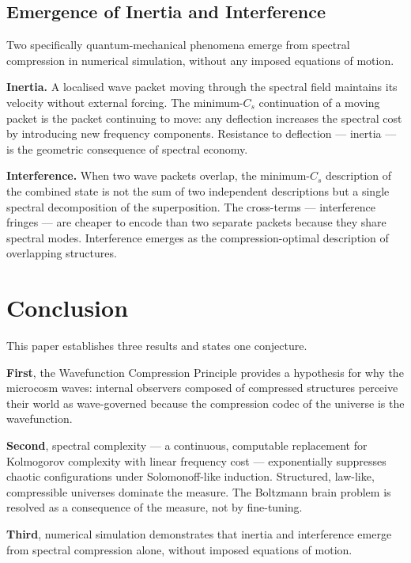 \documentclass[11pt]{article}
\begin{document}
\subsection{Emergence of Inertia and Interference}

Two specifically quantum-mechanical phenomena emerge from spectral
compression in numerical simulation, without any imposed equations of
motion.

\textbf{Inertia.} A localised wave packet moving through the spectral
field maintains its velocity without external forcing. The minimum-$C_s$
continuation of a moving packet is the packet continuing to move: any
deflection increases the spectral cost by introducing new frequency
components. Resistance to deflection --- inertia --- is the geometric
consequence of spectral economy.

\textbf{Interference.} When two wave packets overlap, the minimum-$C_s$
description of the combined state is not the sum of two independent
descriptions but a single spectral decomposition of the superposition.
The cross-terms --- interference fringes --- are cheaper to encode than
two separate packets because they share spectral modes. Interference
emerges as the compression-optimal description of overlapping structures.



\section{Conclusion}
\label{sec:conclusion}

This paper establishes three results and states one conjecture.

\textbf{First}, the Wavefunction Compression Principle provides a
hypothesis for why the microcosm waves: internal observers composed of
compressed structures perceive their world as wave-governed because the
compression codec of the universe is the wavefunction. 

\textbf{Second}, spectral complexity --- a continuous, computable
replacement for Kolmogorov complexity with linear frequency cost ---
exponentially suppresses chaotic configurations under Solomonoff-like
induction. Structured, law-like, compressible universes dominate the
measure. The Boltzmann brain problem is resolved as a consequence of the
measure, not by fine-tuning.

\textbf{Third}, numerical simulation demonstrates that inertia and
interference emerge from spectral compression alone, without imposed
equations of motion.
\end{document}
